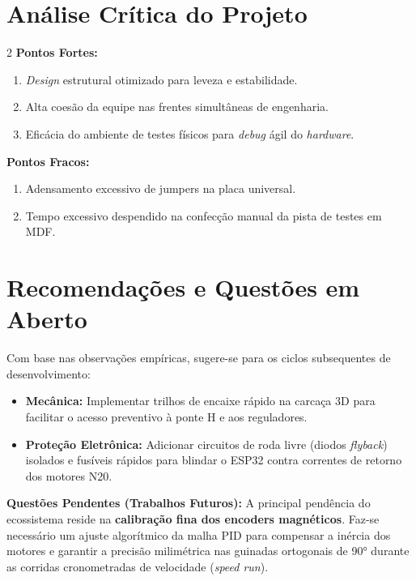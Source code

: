 \section{Análise Crítica do Projeto}

\begin{multicols}{2}
\noindent \textbf{Pontos Fortes:}
\begin{enumerate}[noitemsep, topsep=2pt]
    \item \textit{Design} estrutural otimizado para leveza e estabilidade.
    \item Alta coesão da equipe nas frentes simultâneas de engenharia.
    \item Eficácia do ambiente de testes físicos para \textit{debug} ágil do \textit{hardware}.
\end{enumerate}

\columnbreak

\noindent \textbf{Pontos Fracos:}
\begin{enumerate}[noitemsep, topsep=2pt]
    \item Adensamento excessivo de jumpers na placa universal.
    \item Tempo excessivo despendido na confecção manual da pista de testes em MDF.
\end{enumerate}
\end{multicols}

\section{Recomendações e Questões em Aberto}

Com base nas observações empíricas, sugere-se para os ciclos subsequentes de desenvolvimento:
\begin{itemize}
    \item \textbf{Mecânica:} Implementar trilhos de encaixe rápido na carcaça 3D para facilitar o acesso preventivo à ponte H e aos reguladores.
    \item \textbf{Proteção Eletrônica:} Adicionar circuitos de roda livre (diodos \textit{flyback}) isolados e fusíveis rápidos para blindar o ESP32 contra correntes de retorno dos motores N20.
\end{itemize}

\noindent \textbf{Questões Pendentes (Trabalhos Futuros):} A principal pendência do ecossistema reside na \textbf{calibração fina dos encoders magnéticos}. Faz-se necessário um ajuste algorítmico da malha PID para compensar a inércia dos motores e garantir a precisão milimétrica nas guinadas ortogonais de 90° durante as corridas cronometradas de velocidade (\textit{speed run}).

